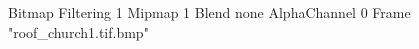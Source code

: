 {Bitmap
	{Filtering 1}
	{Mipmap 1}
	{Blend none}
	{AlphaChannel 0}
	{Frame "roof_church1.tif.bmp"}
}
